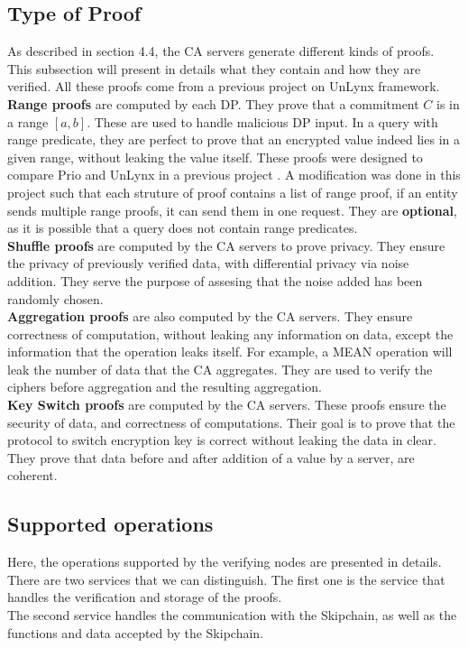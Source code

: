\documentclass{article}
\begin{document}
\subsection{Type of Proof}
As described in section 4.4, the CA servers generate different kinds of proofs. This subsection will present in details what they contain and how they are verified. All these proofs come from a previous project on UnLynx \cite{maxproject} framework.\\
\textbf{Range proofs} are computed by each DP. They prove that a commitment $C$ is in a range $[a,b]$. These are used to handle malicious DP input. In a query with range predicate, they are perfect to prove that an encrypted value indeed lies in a given range, without leaking the value itself. These proofs were designed to compare Prio and UnLynx in a previous project \cite{maxproject}.
A modification was done in this project such that each struture of proof contains a list of range proof, if an entity sends multiple range proofs, it can send them in one request. They are \textbf{optional}, as it is possible that a query does not contain range predicates.\\
\textbf{Shuffle proofs} are computed by the CA servers to prove privacy. They ensure the privacy of previously verified data, with differential privacy via noise addition. They serve the purpose of assesing that the noise added has been randomly chosen.\\
\textbf{Aggregation proofs} are also computed by the CA servers. They ensure correctness of computation, without leaking any information on data, except the information that the operation leaks itself. For example, a MEAN operation will leak the number of data that the CA aggregates. They are used to verify the ciphers before aggregation and the resulting aggregation.\\
\textbf{Key Switch proofs} are computed by the CA servers. These proofs ensure the security of data, and correctness of computations. Their goal is to prove that the protocol to switch encryption key is correct without leaking the data in clear. They prove that data before and after addition of a value by a server, are coherent.\\

\subsection{Supported operations}
Here, the operations supported by the verifying nodes are presented in details.\\
There are two services that we can distinguish. The first one is the service that handles the verification and storage of the proofs.\\
The second service handles the communication with the Skipchain, as well as the functions and data accepted by the Skipchain.\\ 
\end{document}
